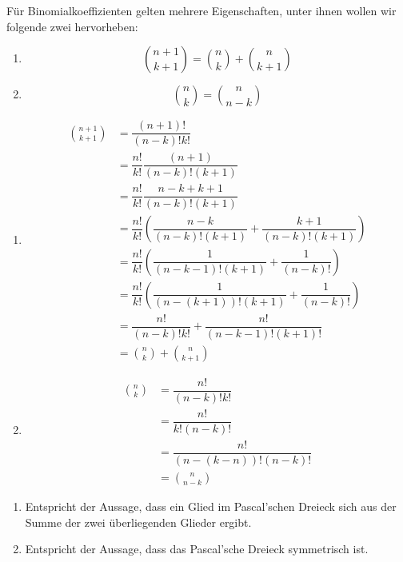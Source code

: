 \documentclass[../MAIN/main.tex]{subfiles}
\begin{document}
\begin{Theorem}
  Für Binomialkoeffizienten gelten mehrere Eigenschaften, unter ihnen wollen wir folgende zwei hervorheben:
  \begin{enumerate}
    \item $${n+1 \choose k+1} = {n \choose k}+{n \choose k+1}$$
    \item $${n \choose k} = {n \choose n-k}$$
  \end{enumerate}
\end{Theorem}
\begin{Beweis}
  \begin{enumerate}
    \item \begin{align*}
      {n+1 \choose k+1} &= \dfrac{(n+1)!}{(n-k)!k!}\\
      &= \dfrac{n!}{k!}\dfrac{(n+1)}{(n-k)!(k+1)}\\
      &= \dfrac{n!}{k!}\dfrac{n-k+k+1}{(n-k)!(k+1)}\\
      &= \dfrac{n!}{k!}  \left( \dfrac{n-k}{(n-k)!(k+1)}+\dfrac{k+1}{(n-k)!(k+1)} \right)\\
      &= \dfrac{n!}{k!}  \left( \dfrac{1}{(n-k-1)!(k+1)}+\dfrac{1}{(n-k)!} \right)\\
      &= \dfrac{n!}{k!}  \left( \dfrac{1}{(n-(k+1))!(k+1)}+\dfrac{1}{(n-k)!} \right)\\
      &= \dfrac{n!}{(n-k)!k!}  + \dfrac{n!}{(n-k-1)!(k+1)!}\\
      &= {n \choose k}+{n \choose k+1}
      \end{align*}
    \item \begin{align*}
      {n \choose k}  &= \dfrac{n!}{(n-k)!k!}\\
      &= \dfrac{n!}{k!(n-k)!}\\
      &= \dfrac{n!}{(n-(k-n))!(n-k)!}\\
      &= {n \choose n-k}
    \end{align*}
  \end{enumerate}
\end{Beweis}
\begin{Bemerkung}
  \begin{enumerate}
    \item Entspricht der Aussage, dass ein Glied im Pascal'schen Dreieck sich aus der Summe der zwei überliegenden Glieder ergibt.
    \item Entspricht der Aussage, dass das Pascal'sche Dreieck symmetrisch ist.
  \end{enumerate}
\end{Bemerkung}
\end{document}

